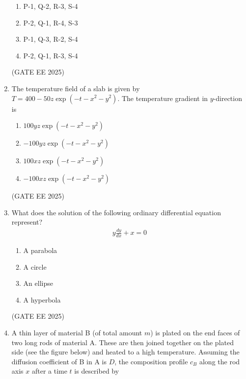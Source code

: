 \documentclass[11pt, letterpaper]{article}
\theoremstyle{remark}
\begin{document}
\begin{enumerate}
\begin{multicols}{2}
\begin{enumerate}  
\item P-1, Q-2, R-3, S-4
\item P-2, Q-1, R-4, S-3
\item P-1, Q-3, R-2, S-4
\item P-2, Q-1, R-3, S-4
\end{enumerate}
\end{multicols}
\hfill(GATE EE 2025)

\item The temperature field of a slab is given by $T = 400 - 50z \exp(-t - x^2 - y^2)$. The temperature gradient in $y$-direction is

\begin{multicols}{2}
\begin{enumerate}  
\item $100yz \exp(-t - x^2 - y^2)$
\item $-100yz \exp(-t - x^2 - y^2)$
\item $100xz \exp(-t - x^2 - y^2)$
\item $-100xz \exp(-t - x^2 - y^2)$
\end{enumerate}
\end{multicols}
\hfill(GATE EE 2025)

\item What does the solution of the following ordinary differential equation represent? 
\begin{align}
    y \frac{dy}{dx} + x = 0
\end{align}

\begin{multicols}{2}
\begin{enumerate}  
\item A parabola
\item A circle
\item An ellipse
\item A hyperbola
\end{enumerate}
\end{multicols}
\hfill(GATE EE 2025)

\item A thin layer of material B (of total amount $m$) is plated on the end faces of two long rods of material A. These are then joined together on the plated side (see the figure below) and heated to a high temperature. Assuming the diffusion coefficient of B in A is $D$, the composition profile $c_B$ along the rod axis $x$ after a time $t$ is described by


\end{enumerate}
\end{document}
